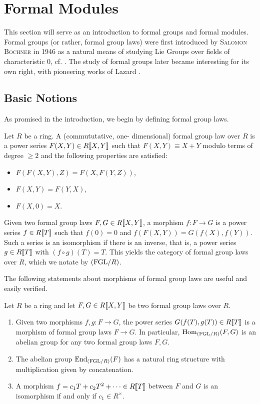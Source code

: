 \documentclass[../main.tex]{subfiles}
\begin{document}
\section{Formal Modules}
This section will serve as an introduction to formal groups and 
formal modules. Formal groups (or rather, formal group laws) were first
introduced by \textsc{Salomon Bochner} in 1946 as a natural means of studying Lie
Groups over fields of characteristic $0$, cf. \cite{Bochner1946FGrps}. 
The study of formal groups later became interesting for its own right, 
with pioneering works of Lazard \cite{Lazard1955FGrps}. 

\subsection{Basic Notions} %
\label{sub:Basic Notions}
As promised in the introduction, we begin by defining {formal group
laws}.

\begin{defi}
    Let $R$ be a ring. A (commututative, one-\allowbreak
    dimen\-sional) formal group law over $R$ is a power series $F(X,Y) \in
    R\llbracket X, Y \rrbracket$ such that $F(X,Y) \equiv X + Y$ modulo terms
    of degree $\geq 2$ and
    the following properties are satisfied:
    \begin{itemize}
        \item $F(F(X,Y),Z) = F(X,F(Y,Z))$,
        \item $F(X,Y) = F(Y,X)$,
        \item $F(X,0) = X$.
    \end{itemize}
\end{defi}

Given two formal group laws $F, G \in R\llbracket X,Y\rrbracket$, a morphism
$f: F\to G$ is a 
power series $f \in R\llbracket T \rrbracket$ such that $f(0) = 0$ and $f(F(X,Y)) =
G(f(X),f(Y))$.
Such a series is an isomorphism if there is an {inverse}, that
is, a power series $g \in R\llbracket T \rrbracket$ with $(f \circ g)(T) = T$.
This yields the category of formal group laws over $R$, which we notate by
${(\mathrm{FGL}/{R})}$.

The following statements about morphisms of formal group laws are 
useful and easily verified.
\begin{lem}\label{lem:FGLeasyfacts}
  Let $R$ be a ring and let $F,G \in R\llbracket X,Y\rrbracket$ be two formal
  group laws over $R$. 
  \begin{enumerate}
    \item Given two morphisms $f,g : F \to G$, the power series $G(f(T), g(T))
      \in R\llbracket T \rrbracket$ is a morphism of formal group laws 
      $F \to G$. In particular, $\operatorname{Hom}_{(\mathrm{FGL}/{R})}(F,G)$ is an abelian
      group for any two formal group laws $F,G$.
    \item The abelian group $\operatorname{End}_{(\mathrm{FGL}/{R})}(F)$ has a natural ring structure
      with multiplication given by concatenation.
    \item A morphism $f = c_1 T + c_2 T^2 + \dots \in R\llbracket T \rrbracket$ between
      $F$ and $G$ is an isomorphism if and only if $c_1 \in R^\times$.
  \end{enumerate}
\end{lem}
\end{document}
